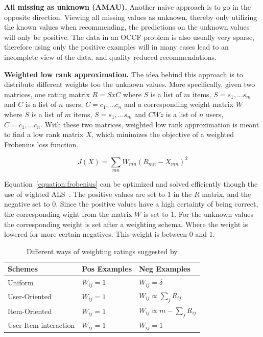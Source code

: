 \textbf{All missing as unknown (AMAU).}
Another naive approach is to go in the opposite direction.
Viewing all missing values as unknown, thereby only utilizing the known values when recommending, the predictions on the unknown values will only be positive.
The data in an OCCF problem is also usually very sparse, therefore using only the positive examples will in many cases lead to an incomplete view of the data, and quality reduced recommendations.

\textbf{Weighted low rank approximation. }
The idea behind this approach is to distribute different weights too the unknown values.
More specifically, given two matrices, one rating matrix $R = SxC$  where $S$ is a list of $m$ items, $S = {s_{1},...s_{m}}$ and $C$ is a list of $n$ users, $C = {c_{1}, ... c_{n}}$ and a corresponding weight matrix $W$ where $S$ is a list of $m$ items, $S = {s_{1},...s_{m}}$ and $CWz$ is a list of $n$ users, $C = {c_{1}, ... c_{n}}$.
With these two matrices, weighted low rank approximation is meant to find a low rank matrix $X$, which minimizes the objective of a weighted Frobenius loss function. 

\begin{equation}
J(X) = \sum_{mn} W_{mn}(R_{mn} - X_{mn})^2
\label{equation:frobenius}
\end{equation}

Equation~\ref{equation:frobenius} can be optimized and solved efficiently though the use of wighted ALS~.
The positive values are set to 1 in the $R$ matrix, and the negative set to 0.
Since the positive values have a high certainty of being correct, the corresponding wight from the matrix $W$ is set to 1.
For the unknown values the corresponding weight is set after a weighting schema.
Where the weight is lowered for more certain negatives.
This weight is between 0 and 1.

\begin{table}[H]
    \centering
    \begin{tabular}{l|l|l}
      \textbf{Schemes}      & \textbf{Pos Examples} & \textbf{Neg Examples} \\ \hline
      Uniform               & $W_{ij} = 1$ & $W_{ij} = δ$ \\ \hline
      User-Oriented         & $W_{ij} = 1$ & $W_{ij} ∝ \sum_{j} R_{ij}$ \\ \hline
      Item-Oriented         & $W_{ij} = 1$ & $W_{ij} ∝ m - \sum_{j} R_{ij}$ \\ \hline
      User-Item interaction & $W_{ij} = 1$ & $W_{ij} = 1$  \\
    \end{tabular}
    \label{table:WeightingSchemes}
    \caption[Weighting Schemes]{Different ways of weighting ratings suggested by}
\end{table}

